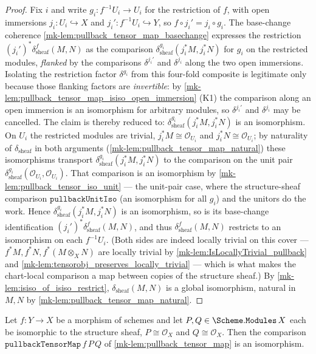\begin{proof}
  Fix \(i\) and write \(g_i : f^{-1}U_i \to U_i\) for the restriction of \(f\), with open
  immersions \(j_i : U_i \hookrightarrow X\) and \(j_i' : f^{-1}U_i \hookrightarrow Y\),
  so \(f \circ j_i' = j_i \circ g_i\). The base-change coherence
  \ref{mk-lem:pullback_tensor_map_basechange} expresses the restriction
  \((j_i')^*\delta^{f}_{\mathrm{sheaf}}(M,N)\) as the comparison
  \(\delta^{g_i}_{\mathrm{sheaf}}(j_i^*M, j_i^*N)\) for \(g_i\) on the restricted modules,
  \emph{flanked} by the comparisons \(\delta^{j_i'}\) and \(\delta^{j_i}\) along the two open
  immersions. Isolating the restriction factor \(\delta^{g_i}\) from this four-fold composite
  is legitimate only because those flanking factors are \emph{invertible}: by
  \ref{mk-lem:pullback_tensor_map_isiso_open_immersion} (K1) the comparison along an open
  immersion is an isomorphism for arbitrary modules, so \(\delta^{j_i'}\) and \(\delta^{j_i}\)
  may be cancelled. The claim is thereby reduced to:
  \(\delta^{g_i}_{\mathrm{sheaf}}(j_i^*M, j_i^*N)\) is an isomorphism. On \(U_i\) the restricted modules are trivial, \(j_i^*M \cong
  \mathcal{O}_{U_i}\) and \(j_i^*N \cong \mathcal{O}_{U_i}\); by naturality of
  \(\delta_{\mathrm{sheaf}}\) in both arguments (\ref{mk-lem:pullback_tensor_map_natural})
  these isomorphisms transport \(\delta^{g_i}_{\mathrm{sheaf}}(j_i^*M, j_i^*N)\) to the
  comparison on the unit pair \(\delta^{g_i}_{\mathrm{sheaf}}(\mathcal{O}_{U_i},
  \mathcal{O}_{U_i})\). That comparison is an isomorphism by
  \ref{mk-lem:pullback_tensor_iso_unit} --- the unit-pair case, where the structure-sheaf
  comparison \(\mathtt{pullbackUnitIso}\) (an isomorphism for all \(g_i\)) and the unitors
  do the work. Hence \(\delta^{g_i}_{\mathrm{sheaf}}(j_i^*M, j_i^*N)\) is an isomorphism,
  so is its base-change identification \((j_i')^*\delta^{f}_{\mathrm{sheaf}}(M,N)\), and
  thus \(\delta^{f}_{\mathrm{sheaf}}(M,N)\) restricts to an isomorphism on each
  \(f^{-1}U_i\). (Both sides are indeed locally trivial on this cover --- \(f^*M, f^*N,
  f^*(M\otimes_X N)\) are locally trivial by \ref{mk-lem:IsLocallyTrivial_pullback} and
  \ref{mk-lem:tensorobj_preserves_locally_trivial} --- which is what makes the chart-local
  comparison a map between copies of the structure sheaf.) By
  \ref{mk-lem:isiso_of_isiso_restrict}, \(\delta_{\mathrm{sheaf}}(M,N)\) is a global
  isomorphism, natural in \(M, N\) by \ref{mk-lem:pullback_tensor_map_natural}.
\end{proof}

\begin{lemma}\label{mk-lem:pullback_tensor_map_isiso_base_unit}
  \leanok

  Let \(f : Y \to X\) be a morphism of schemes and let
  \(P, Q \in \Scheme.\mathtt{Modules}\,X\) each be isomorphic to the structure sheaf,
  \(P \cong \mathcal{O}_X\) and \(Q \cong \mathcal{O}_X\). Then the comparison
  \(\mathtt{pullbackTensorMap}\,f\,P\,Q\) of \ref{mk-lem:pullback_tensor_map} is an isomorphism.
\end{lemma}

